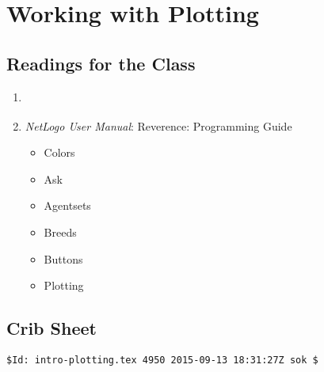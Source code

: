 \chapter{Working with Plotting\label{ch:intro_plotting}}

\setcounter{section}{-1}


\section{Readings for the Class}

\begin{enumerate}
\item \citet[chapter 2, pages 87--99]{wilensky_rand_2015}
\item {\it NetLogo User Manual}:
 Reverence: Programming Guide
\begin{itemize}
\item    Colors
\item    Ask
\item    Agentsets
\item    Breeds
\item    Buttons
\item    Plotting
\end{itemize}

\end{enumerate}


\section{Crib Sheet}


\ifnum{}
\vfill
\noindent\verb+$Id: intro-plotting.tex 4950 2015-09-13 18:31:27Z sok $+
\fi